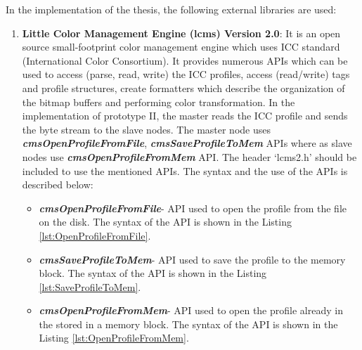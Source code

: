 In the implementation of the thesis, the following external libraries are used:    
\begin{enumerate}
\item \textbf{Little Color Management Engine (lcms) Version 2.0}: It is an open source small-footprint color management engine which uses ICC standard (International Color Consortium). It provides numerous APIs which can be used to access (parse, read, write) the ICC profiles, access (read/write) tags and profile structures, create formatters which describe the organization of the bitmap buffers and performing color transformation.  In the implementation of prototype II, the master reads the ICC profile  and sends the byte stream to the slave nodes. The master node uses \textbf{\textit{cmsOpenProfileFromFile}}, \textbf{\textit{cmsSaveProfileToMem}} APIs where as slave nodes use \textit{\textbf{cmsOpenProfileFromMem}} API. The header {\lq}lcms2.h{\rq} should be included to use the mentioned APIs. The syntax and the use of the APIs is described below:

\begin{itemize}
\item \textbf{\textit{cmsOpenProfileFromFile}}- API used to open the profile from the file on the disk. The syntax of the API is shown in the Listing \ref{lst:OpenProfileFromFile}.
\item \textbf{\textit{cmsSaveProfileToMem}}- API used to save the profile to the memory block. The syntax of the API is shown in the Listing \ref{lst:SaveProfileToMem}. 
\item \textbf{\textit{cmsOpenProfileFromMem}}- API used to open the profile already in the stored in a memory block. The syntax of the API is shown in the Listing \ref{lst:OpenProfileFromMem}. 
\end{itemize} 


\end{enumerate}
